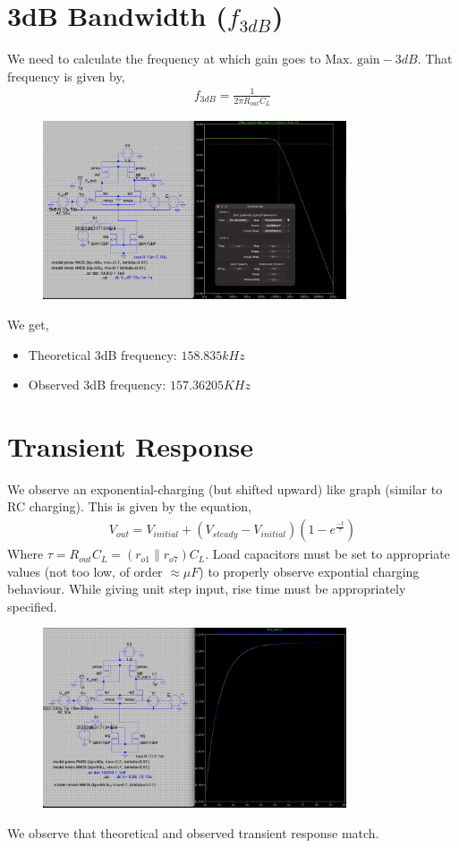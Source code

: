\documentclass[12pt,a4paper]{article}
\newcommand{\brak}[1]{\ensuremath{\left(#1\right)}}
\providecommand{\brak}[1]{\ensuremath{\left(#1\right)}}
\begin{document}
\section{3dB Bandwidth ($f_{3dB}$)}
We need to calculate the frequency at which gain goes to $\text{Max. gain}-3dB$. That frequency is given by,
\begin{align*}
f_{3dB} = \frac{1}{2 \pi R_{out} C_L}
\end{align*}
\vspace{6pt}
\begin{figure}[H]
    \centering
    \includegraphics[width=0.8\textwidth]{figs/3dB.png}
\end{figure}
We get,
\begin{itemize}
    \item Theoretical 3dB frequency: $158.835kHz$
    \item Observed 3dB frequency: $157.36205KHz$
\end{itemize}

\vspace{10pt}
\section{Transient Response}
We observe an exponential-charging (but shifted upward) like graph (similar to RC charging). This is given by the equation,
\begin{align*}
    V_{out}=V_{initial} + (V_{steady}-V_{initial})\brak{1-e^{\frac{-t}{\tau}}}
\end{align*}
Where $\tau = R_{out} C_L = (r_{o1} \parallel r_{o7}) C_L$. Load capacitors must be set to appropriate values (not too low, of order $\approx \mu F$) to properly observe expontial charging behaviour. While giving unit step input, rise time must be appropriately specified.
\begin{figure}[H]
    \centering
    \includegraphics[width=0.8\textwidth]{figs/transient.png}
\end{figure}
We observe that theoretical and observed transient response match.
\end{document}
